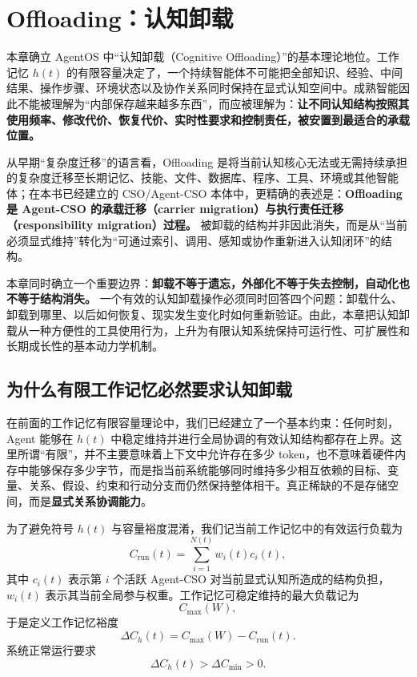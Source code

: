 \chapter{Offloading：认知卸载}
\label{chap:offloading}

\begin{chapterlead}
本章确立 AgentOS 中“认知卸载（Cognitive Offloading）”的基本理论地位。工作记忆 $h(t)$ 的有限容量决定了，一个持续智能体不可能把全部知识、经验、中间结果、操作步骤、环境状态以及协作关系同时保持在显式认知空间中。成熟智能因此不能被理解为“内部保存越来越多东西”，而应被理解为：\textbf{让不同认知结构按照其使用频率、修改代价、恢复代价、实时性要求和控制责任，被安置到最适合的承载位置。}

从早期“复杂度迁移”的语言看，Offloading 是将当前认知核心无法或无需持续承担的复杂度迁移至长期记忆、技能、文件、数据库、程序、工具、环境或其他智能体；在本书已经建立的 CSO/Agent-CSO 本体中，更精确的表述是：\textbf{Offloading 是 Agent-CSO 的承载迁移（carrier migration）与执行责任迁移（responsibility migration）过程。} 被卸载的结构并非因此消失，而是从“当前必须显式维持”转化为“可通过索引、调用、感知或协作重新进入认知闭环”的结构。

本章同时确立一个重要边界：\textbf{卸载不等于遗忘，外部化不等于失去控制，自动化也不等于结构消失。} 一个有效的认知卸载操作必须同时回答四个问题：卸载什么、卸载到哪里、以后如何恢复、现实发生变化时如何重新验证。由此，本章把认知卸载从一种方便性的工具使用行为，上升为有限认知系统保持可运行性、可扩展性和长期成长性的基本动力学机制。
\end{chapterlead}

\section{为什么有限工作记忆必然要求认知卸载}

在前面的工作记忆有限容量理论中，我们已经建立了一个基本约束：任何时刻，Agent 能够在 $h(t)$ 中稳定维持并进行全局协调的有效认知结构都存在上界。这里所谓“有限”，并不主要意味着上下文中允许存在多少 token，也不意味着硬件内存中能够保存多少字节，而是指当前系统能够同时维持多少相互依赖的目标、变量、关系、假设、约束和行动分支而仍然保持整体相干。真正稀缺的不是存储空间，而是\textbf{显式关系协调能力}。

为了避免符号 $h(t)$ 与容量裕度混淆，我们记当前工作记忆中的有效运行负载为
\begin{equation}
C_{\mathrm{run}}(t)
=
\sum_{i=1}^{N(t)}
w_i(t)c_i(t),
\end{equation}
其中 $c_i(t)$ 表示第 $i$ 个活跃 Agent-CSO 对当前显式认知所造成的结构负担，$w_i(t)$ 表示其当前全局参与权重。工作记忆可稳定维持的最大负载记为
\begin{equation}
C_{\max}(W),
\end{equation}
于是定义工作记忆裕度
\begin{equation}
\Delta C_h(t)
=
C_{\max}(W)-C_{\mathrm{run}}(t).
\end{equation}
系统正常运行要求
\begin{equation}
\Delta C_h(t)>\Delta C_{\min}>0.
\end{equation}

